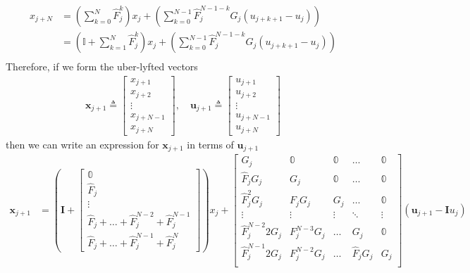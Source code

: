 \documentclass{article}
\begin{document}
\begin{align}
x_{j+N} 
& = \left(\sum_{k=0}^{N}\hat{F}_j^k \right)x_j + \left( \sum_{k=0}^{N-1}\hat{F}_j^{N-1-k} G_j \left(u_{j+k+1} -u_{j} \right) \right)\\
& = \left(\mathbb{I} + \sum_{k=1}^{N}\hat{F}_j^k \right)x_j + \left( \sum_{k=0}^{N-1}\hat{F}_j^{N-1-k} G_j \left(u_{j+k+1} -u_{j} \right) \right)\\
\end{align}
Therefore, if we form the uber-lyfted vectors
\begin{align}
\mathbf{x}_{j+1} \triangleq \begin{bmatrix} x_{j+1} \\ x_{j+2} \\ \vdots \\ x_{j+N-1} \\ x_{j+N}\end{bmatrix}, \quad 
\mathbf{u}_{j+1} \triangleq \begin{bmatrix} u_{j+1} \\ u_{j+2} \\ \vdots \\ u_{j+N-1} \\ u_{j+N}\end{bmatrix}
\end{align}
then we can write an expression for $\mathbf{x}_{j+1}$ in terms of $\mathbf{u}_{j+1}$
\begin{align}
\mathbf{x}_{j+1} 
& = \left( \mathbf{I} + \begin{bmatrix} \mathbb{0} \\ \hat{F}_j \\ \vdots \\ \hat{F}_j + \hdots +\hat{F}_j^{N-2}+\hat{F}_j^{N-1} \\ \hat{F}_j + \hdots +\hat{F}_j^{N-1}+\hat{F}_j^{N}\end{bmatrix}\right) x_j 
  + \begin{bmatrix} 
  G_j 				& \mathbb{0} 	& \mathbb{0} 	& \hdots & \mathbb{0}\\
  \hat{F}_jG_j 		& G_j 			& \mathbb{0} 	& \hdots & \mathbb{0}\\
  \hat{F}_j^2G_j 	& F_j G_j 		& G_j 			& \hdots & \mathbb{0}\\
  \vdots 			& \vdots 		& \vdots 		& \ddots & \vdots\\
  \hat{F}_j^{N-2}2G_j 	& F_j^{N-3} G_j 		& \hdots 			&  G_j & \mathbb{0}\\
  \hat{F}_j^{N-1}2G_j 	& F_j^{N-2} G_j 		& \hdots 			& \hat{F}_j G_j & G_j\\
  \end{bmatrix} \left(\mathbf{u}_{j+1} - \mathbf{I}u_j \right)
\end{align}
\end{document}
